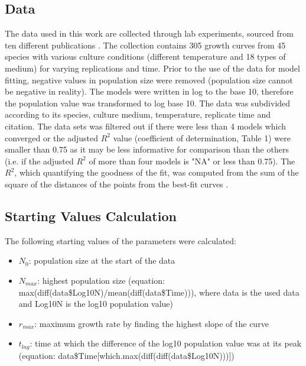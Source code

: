 \documentclass[a4paper,11pt]{article}
\theoremstyle{definition}
\begin{document}
\begin{linenumbers}
\subsection{Data}
The data used in this work are collected through lab experiments, sourced from ten different publications \citep{bae2014growth,bernhardt2018metabolic,galarz2016predicting,gill1991growth,phillips1987relation,roth1962continuity,silva2018modelling,sivonen1990effects, stannard1985temperature,zwietering1994modeling}. The collection contains 305 growth curves from 45 species with various culture conditions (different temperature and 18 types of medium) for varying replications and time. Prior to the use of the data for model fitting, negative values in population size were removed (population size cannot be negative in reality). The models were written in log to the base 10, therefore the population value was transformed to log base 10. The data was subdivided according to its species, culture medium, temperature, replicate time and citation. The data sets was filtered out if there were less than 4 models which converged or the adjusted $R^{2}$ value (coefficient of determination, Table 1) were smaller than 0.75 as it may be less informative for comparison than the others (i.e. if the adjusted $R^{2}$ of more than four models is "NA" or less than 0.75). The $R^{2}$, which quantifying the goodness of the fit, was computed from the sum of the square of the distances of the points from the best-fit curves \citep{motulsky2004fitting}.

\subsection{Starting Values Calculation}
The following starting values of the parameters were calculated:
\begin{itemize}
	\item $N_0$: population size at the start of the data
    \item $N_{max}$: highest population size (equation: max(diff(data\$Log10N)/mean(diff(data\$Time))), where data is the used data and Log10N is the log10 population value)
    \item $r_{max}$: maximum growth rate by finding the highest slope of the curve
	\item $t_{lag}$: time at which the difference of the log10 population value was at its peak (equation: data\$Time[which.max(diff(diff(data\$Log10N)))])
\end{itemize}


\end{linenumbers}
\end{document}
